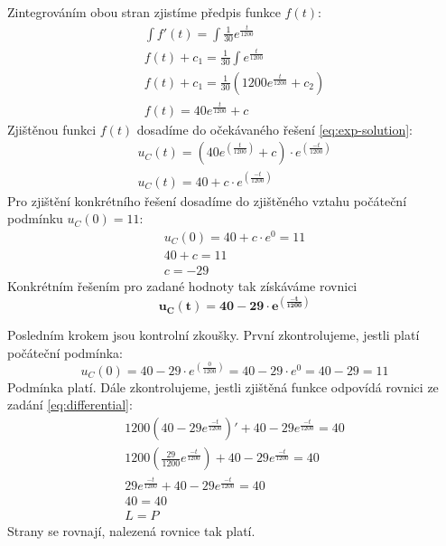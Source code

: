 Zintegrováním obou stran zjistíme předpis funkce $f(t)$:
\begin{gather*}
    \int f'(t) = \int \frac{1}{30} e^{\frac{t}{1200}} \\
    f(t) + c_1 = \frac{1}{30} \int e^{\frac{t}{1200}} \\
    f(t) + c_1 = \frac{1}{30} (1200 e^{\frac{t}{1200}} + c_2) \\
    f(t) = 40  e^{\frac{t}{1200}} + c
\end{gather*}
Zjištěnou funkci $f(t)$ dosadíme do očekávaného řešení \eqref{eq:exp-solution}:
\begin{gather*}
    u_C(t) = \left(40  e^{\displaystyle \left(\frac{t}{1200}\right)} + c\right) \cdot e^{\displaystyle \left(\frac{-t}{1200}\right)} \\
    u_C(t) = 40 + c\cdot e^{\displaystyle \left(\frac{-t}{1200}\right)}
\end{gather*}
Pro zjištění konkrétního řešení dosadíme do zjištěného vztahu počáteční podmínku $u_C(0) = 11$:
\begin{gather*}
    u_C(0) = 40 + c\cdot e^0 = 11 \\
    40 + c = 11 \\
    c = -29
\end{gather*}
Konkrétním řešením pro zadané hodnoty tak získáváme rovnici
\[
    \mathbf{u_C(t) = 40 - 29 \cdot e^{\displaystyle \left(\frac{-t}{1200}\right)}}
\]

Posledním krokem jsou kontrolní zkoušky. První zkontrolujeme, jestli platí počáteční podmínka:
\[
    u_C(0) = 40 - 29 \cdot e^{\displaystyle \left(\frac{0}{1200}\right)} = 40 - 29\cdot e^0 = 40 - 29 = 11
\]
Podmínka platí. Dále zkontrolujeme, jestli zjištěná funkce odpovídá rovnici ze zadání \eqref{eq:differential}:
\begin{gather*}
    1200(40 - 29 e^{\frac{-t}{1200}})' + 40 - 29 e^{\frac{-t}{1200}} = 40 \\
    1200(\frac{29}{1200}  e^{\frac{-t}{1200}}) + 40 - 29 e^{\frac{-t}{1200}} = 40 \\
    29 e^{\frac{-t}{1200}} + 40 - 29 e^{\frac{-t}{1200}} = 40 \\
    40 = 40 \\
    L = P
\end{gather*}
Strany se rovnají, nalezená rovnice tak platí.